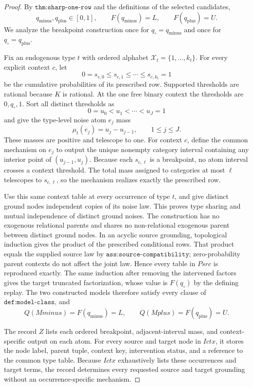 \documentclass{article}
\begin{document}
\begin{proof}
By \(\texttt{thm:sharp-one-row}\) and the definitions of the selected candidates,
\[
 q_{\mathrm{minus}},q_{\mathrm{plus}}\in[0,1],
 \qquad
 F(q_{\mathrm{minus}})=L,
 \qquad
 F(q_{\mathrm{plus}})=U.
\]
We analyze the breakpoint construction once for \(q_\circ=q_{\mathrm{minus}}\) and once for \(q_\circ=q_{\mathrm{plus}}\).

Fix an endogenous type \(t\) with ordered alphabet \(\mathcal X_t=\{1,\ldots,k_t\}\).  For every explicit context \(c\), let
\[
 0=s_{c,0}\leq s_{c,1}\leq\cdots\leq s_{c,k_t}=1
\]
be the cumulative probabilities of its prescribed row.  Supported thresholds are rational because \(K\) is rational.  At the one free binary context the thresholds are \(0,q_\circ,1\).  Sort all distinct thresholds as
\[
 0=u_0<u_1<\cdots<u_J=1
\]
and give the type-level noise atom \(e_j\) mass
\[
 \mu_t(e_j)=u_j-u_{j-1},\qquad 1\leq j\leq J.
\]
These masses are positive and telescope to one.  For context \(c\), define the common mechanism on \(e_j\) to output the unique nonempty category interval containing any interior point of \((u_{j-1},u_j)\).  Because each \(s_{c,\ell}\) is a breakpoint, no atom interval crosses a context threshold.  The total mass assigned to categories at most \(\ell\) telescopes to \(s_{c,\ell}\), so the mechanism realizes exactly the prescribed row.

Use this same context table at every occurrence of type \(t\), and give distinct ground nodes independent copies of its noise law.  This proves type sharing and mutual independence of distinct ground noises.  The construction has no exogenous relational parents and shares no non-relational exogenous parent between distinct ground nodes.  In an acyclic source grounding, topological induction gives the product of the prescribed conditional rows.  That product equals the supplied source law by \(\texttt{ass:source-compatibility}\); zero-probability parent contexts do not affect the joint law.  Hence every table in \(Psrc\) is reproduced exactly.  The same induction after removing the intervened factors gives the target truncated factorization, whose value is \(F(q_\circ)\) by the defining replay.  The two constructed models therefore satisfy every clause of \(\texttt{def:model-class}\), and
\[
 Q(Mminus)=F(q_{\mathrm{minus}})=L,
 \qquad
 Q(Mplus)=F(q_{\mathrm{plus}})=U.
\]

The record \(Z\) lists each ordered breakpoint, adjacent-interval mass, and context-specific output on each atom.  For every source and target node in \(Ictx\), it stores the node label, parent tuple, context key, intervention status, and a reference to the common type table.  Because \(Ictx\) exhaustively lists these occurrences and target terms, the record determines every requested source and target grounding without an occurrence-specific mechanism.


\end{proof}
\end{document}
